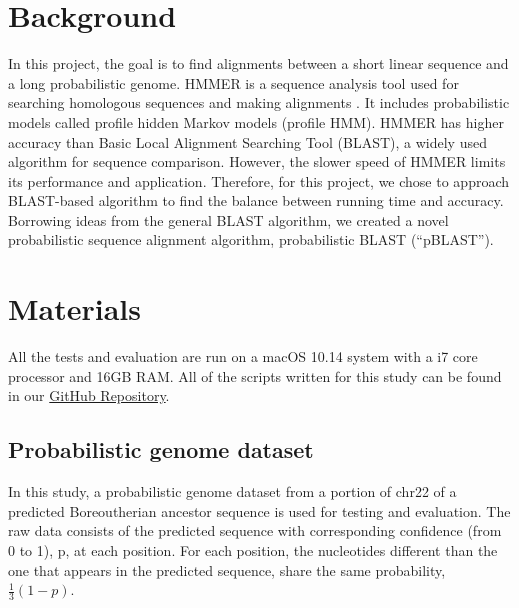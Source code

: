 \documentclass[12pt]{article}
\begin{document}

\label{Background}
\section{Background}
In this project, the goal is to find alignments between a short linear sequence and a long probabilistic genome. HMMER is a sequence analysis tool used for searching homologous sequences and making alignments \cite{eddy2009}. It includes probabilistic models called profile hidden Markov models (profile HMM). HMMER has higher accuracy than Basic Local Alignment Searching Tool (BLAST), a widely used algorithm for sequence comparison. However, the slower speed of HMMER limits its performance and application. Therefore, for this project, we chose to approach BLAST-based algorithm to find the balance between running time and accuracy. Borrowing ideas from the general BLAST algorithm, we created a novel probabilistic sequence alignment algorithm, probabilistic BLAST (“pBLAST”).



\label{Materials}
\section{Materials}
All the tests and evaluation are run on a macOS 10.14 system with a i7 core processor and 16GB RAM. All of the scripts written for this study can be found in our  \href{https://github.com/yifnzhao/probabilistic-sequence-alignment}{GitHub Repository}.

\subsection{Probabilistic genome dataset}
In this study, a probabilistic genome dataset from a portion of chr22 of a predicted Boreoutherian ancestor sequence is used for testing and evaluation. The raw data consists of the predicted sequence with corresponding confidence (from 0 to 1), p,  at each position. For each position, the nucleotides different than the one that appears in the predicted sequence, share the same probability, $\frac{1}{3}(1-p)$.

\label{queryGeneration}
\end{document}
